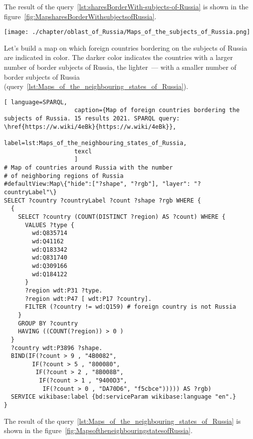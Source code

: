 The result of the query~\ref{lst:sharesBorderWith-subjects-of-Russia} is shown in the figure~\ref{fig:MapsharesBorderWithsubjectsofRussia}.

\begin{figure*}[h]
	\texttt{[image: ./chapter/oblast\_of\_Russia/Maps\_of\_the\_subjects\_of\_Russia.png]}
	\caption[Map of the subjects of Russia bordering on foreign countries, 2021.]{Map of the subjects of Russia bordering on foreign countries, 2021. The map is based on the data received by the request~\protect\ref{lst:sharesBorderWith-subjects-of-Russia}.}%
      \label{fig:MapsharesBorderWithsubjectsofRussia}%
\end{figure*}

Let's build a map on which foreign countries bordering on the subjects of Russia are indicated in color. The darker color indicates the countries with a larger number of border subjects of Russia, the lighter~--- with a smaller number of border subjects of Russia (query~\ref{lst:Maps_of_the_neighbouring_states_of_Russia}).

\lstset{numbers=left, firstnumber=1, frame=single}
\begin{lstlisting}[ language=SPARQL, 
                    caption={Map of foreign countries bordering the subjects of Russia. 15 results 2021. SPARQL query: \href{https://w.wiki/4eBk}{https://w.wiki/4eBk}},
                    label=lst:Maps_of_the_neighbouring_states_of_Russia,
                    texcl 
                    ]
# Map of countries around Russia with the number 
# of neighboring regions of Russia
#defaultView:Map\{"hide":["?shape", "?rgb"], "layer": "?countryLabel"\}
SELECT ?country ?countryLabel ?count ?shape ?rgb WHERE {
  {
    SELECT ?country (COUNT(DISTINCT ?region) AS ?count) WHERE {
      VALUES ?type {
        wd:Q835714
        wd:Q41162
        wd:Q183342
        wd:Q831740
        wd:Q309166
        wd:Q184122
      }
      ?region wdt:P31 ?type.
      ?region wdt:P47 [ wdt:P17 ?country].
      FILTER (?country != wd:Q159) # foreign country is not Russia
    }
    GROUP BY ?country
    HAVING ((COUNT(?region)) > 0 )
  }
  ?country wdt:P3896 ?shape.
  BIND(IF(?count > 9 , "4B0082", 
        IF(?count > 5 , "800080", 
         IF(?count > 2 , "8B008B", 
          IF(?count > 1 , "9400D3", 
           IF(?count > 0 , "DA70D6", "f5cbce"))))) AS ?rgb)
  SERVICE wikibase:label {bd:serviceParam wikibase:language "en".}
}
\end{lstlisting}%

The result of the query~\ref{lst:Maps_of_the_neighbouring_states_of_Russia} is shown in the figure~\ref{fig:MapsoftheneighbouringstatesofRussia}.

